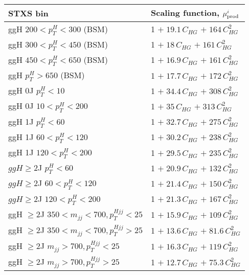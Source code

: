 \begin{tabular}{l|p{}}
    STXS bin & Scaling function, $\mu^i_{\rm{prod}}$ \\ \hline
    ggH $200< p_{T}^{H} < 300$ (BSM) & 1 $+\;19.1\,C_{HG}$ $+\;164\,C_{HG}^{2}$ \\
    ggH $300< p_{T}^{H} < 450$ (BSM) & 1 $+\;18\,C_{HG}$ $+\;161\,C_{HG}^{2}$ \\
    ggH $450 < p_{T}^{H} < 650$ (BSM) & 1 $+\;16.9\,C_{HG}$ $+\;161\,C_{HG}^{2}$ \\
    ggH $p_{T}^{H} > 650$ (BSM) & 1 $+\;17.7\,C_{HG}$ $+\;172\,C_{HG}^{2}$ \\
    ggH 0J $p_{T}^{H} < 10$ & 1 $+\;34.4\,C_{HG}$ $+\;308\,C_{HG}^{2}$ \\
    ggH 0J $10 < p_{T}^{H} < 200$ & 1 $+\;35\,C_{HG}$ $+\;313\,C_{HG}^{2}$ \\
    ggH 1J $p_{T}^{H} < 60$ & 1 $+\;32.7\,C_{HG}$ $+\;275\,C_{HG}^{2}$ \\
    ggH 1J $60 < p_{T}^{H} < 120$ & 1 $+\;30.2\,C_{HG}$ $+\;238\,C_{HG}^{2}$ \\
    ggH 1J $120 < p_{T}^{H} < 200$ & 1 $+\;29.5\,C_{HG}$ $+\;235\,C_{HG}^{2}$ \\
    $ggH \geq$2J $p_{T}^{H} < 60$ & 1 $+\;20.9\,C_{HG}$ $+\;132\,C_{HG}^{2}$ \\
    $ggH \geq$2J $60 < p_{T}^{H} < 120$ & 1 $+\;21.4\,C_{HG}$ $+\;150\,C_{HG}^{2}$ \\
    $ggH \geq$2J $120 < p_{T}^{H} < 200$ & 1 $+\;21.3\,C_{HG}$ $+\;167\,C_{HG}^{2}$ \\
    ggH $\geq$2J $350 < m_{jj} < 700, p_{T}^{Hjj} < 25$ & 1 $+\;15.9\,C_{HG}$ $+\;109\,C_{HG}^{2}$ \\
    ggH $\geq$2J $350 < m_{jj} < 700, p_{T}^{Hjj} > 25$ & 1 $+\;13.6\,C_{HG}$ $+\;81.6\,C_{HG}^{2}$ \\
    ggH $\geq$2J $m_{jj} > 700, p_{T}^{Hjj} < 25$ & 1 $+\;16.3\,C_{HG}$ $+\;119\,C_{HG}^{2}$ \\
    ggH $\geq$2J $m_{jj} > 700, p_{T}^{Hjj} > 25$ & 1 $+\;12.7\,C_{HG}$ $+\;75.3\,C_{HG}^{2}$ \\
\end{tabular}